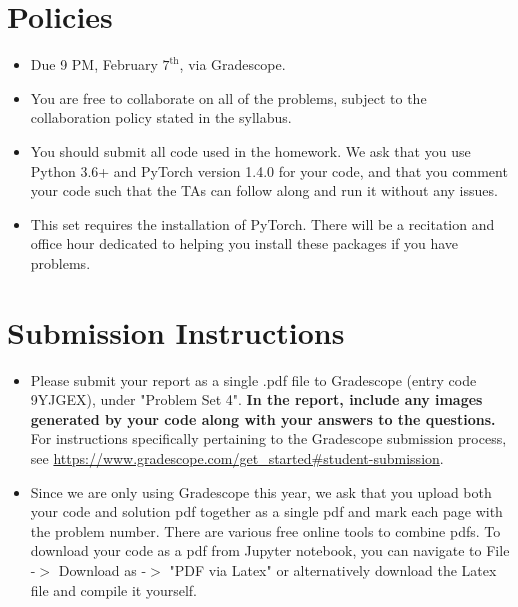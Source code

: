 \newif\ifshowsolutions
\showsolutionstrue







\pagestyle{fancy}




\section*{Policies}
\begin{itemize}
  \item Due 9 PM, February $7^\text{th}$, via Gradescope.
  \item You are free to collaborate on all of the problems, subject to the collaboration policy stated in the syllabus.
  \item You should submit all code used in the homework. We ask that you use Python 3.6+ and PyTorch version 1.4.0 for your code, and that you comment your code such that the TAs can follow along and run it without any issues.
  \item This set requires the installation of PyTorch. There will be a recitation and office hour dedicated to helping you install these packages if you have problems.
\end{itemize}

\section*{Submission Instructions}
\begin{itemize}
   \item Please submit your report as a single .pdf file to Gradescope (entry code 9YJGEX), under "Problem Set 4". \textbf{In the report, include any images generated by your code along with your answers to the questions.} For instructions specifically pertaining to the Gradescope submission process, see \url{https://www.gradescope.com/get_started#student-submission}.
   
   \item Since we are only using Gradescope this year, we ask that you upload both your code and solution pdf together as a single pdf and mark each page with the problem number. There are various free online tools to combine pdfs. To download your code as a pdf from Jupyter notebook, you can navigate to File -$>$ Download as -$>$ "PDF via Latex" or alternatively download the Latex file and compile it yourself.
\end{itemize}

